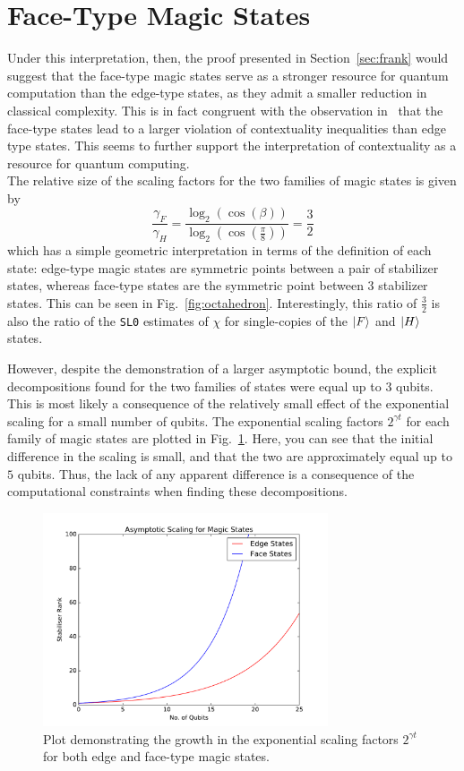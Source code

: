 \documentclass{standalone}
\begin{document}
\section{Face-Type Magic States}
Under this interpretation, then, the proof presented in Section~\ref{sec:frank} would suggest that the face-type magic states serve as a stronger resource for quantum computation than the edge-type states, as they admit a smaller reduction in classical complexity. This is in fact congruent with the observation in~\cite{Howard2014} that the face-type states lead to a larger violation of contextuality inequalities than edge type states. This seems to further support the interpretation of contextuality as a resource for quantum computing. \\
The relative size of the scaling factors for the two families of magic states is given by
\begin{equation}
    \frac{\gamma_{F}}{\gamma_{H}} = \frac{\log_{2}\left(\cos(\beta)\right)}{\log_{2}\left(\cos(\frac{\pi}{8})\right)} = \frac{3}{2}
\end{equation}
which has a simple geometric interpretation in terms of the definition of each state: edge-type magic states are symmetric points between a pair of stabilizer states, whereas face-type states are the symmetric point between 3 stabilizer states. This can be seen in Fig.~\ref{fig:octahedron}. 
Interestingly, this ratio of $\frac{3}{2}$ is also the ratio of the \texttt{SL0} estimates of $\chi$ for single-copies of the $\ket{F}$ and $\ket{H}$ states. 
\par
However, despite the demonstration of a larger asymptotic bound, the explicit decompositions found for the two families of states were equal up to $3$ qubits. This is most likely a consequence of the relatively small effect of the exponential scaling for a small number of qubits. The exponential scaling factors $2^{\gamma t}$ for each family of magic states are plotted in Fig.~\ref{fig:magicscale}. Here, you can see that the initial difference in the scaling is small, and that the two are approximately equal up to $5$ qubits. Thus, the lack of any apparent difference is a consequence of the computational constraints when finding these decompositions. 
\begin{figure}[t]
\centering
\includegraphics[width=0.75\textwidth]{Figures/magicrank.pdf}
\caption{Plot demonstrating the growth in the exponential scaling factors $2^{\gamma t}$ for both edge and face-type magic states.}
\label{fig:magicscale}
\end{figure}
\end{document}

